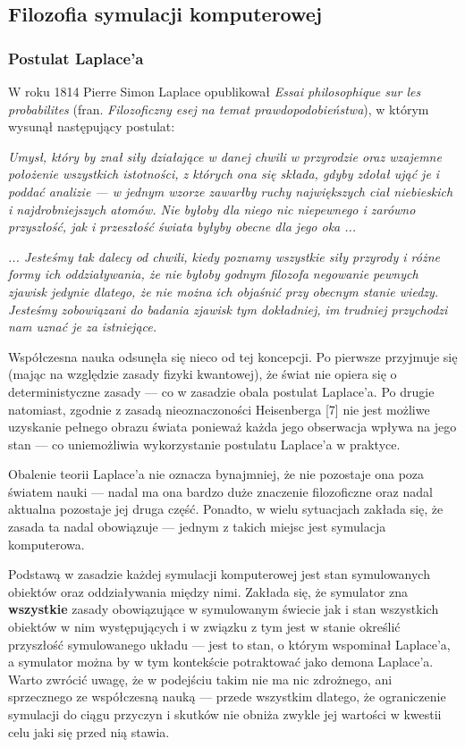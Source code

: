 \subsection{Filozofia symulacji komputerowej}

\subsubsection{Postulat Laplace'a}
\par{
W roku 1814 Pierre Simon Laplace opublikował \textit{Essai philosophique sur les probabilites} (fran. \textit{Filozoficzny esej na temat prawdopodobieństwa}), w którym wysunął następujący postulat:
}
\par{
\textit{Umysł, który by znał siły działające w danej chwili w przyrodzie oraz wzajemne położenie wszystkich istotności, z których ona się składa, gdyby zdołał ująć je i poddać analizie --- w jednym wzorze zawarłby ruchy największych ciał niebieskich i najdrobniejszych atomów. Nie byłoby dla niego nic niepewnego i zarówno przyszłość, jak i przeszłość świata byłyby obecne dla jego oka ...
}}
\par{
\textit{... Jesteśmy tak dalecy od chwili, kiedy poznamy wszystkie siły przyrody i różne formy ich oddziaływania, że nie byłoby godnym filozofa negowanie pewnych zjawisk jedynie dlatego, że nie można ich objaśnić przy obecnym stanie wiedzy. Jesteśmy zobowiązani do badania zjawisk tym dokładniej, im trudniej przychodzi nam uznać je za istniejące.}
}

\par{
Współczesna nauka odsunęła się nieco od tej koncepcji. Po pierwsze przyjmuje się (mając na względzie zasady fizyki kwantowej), że świat nie opiera się o deterministyczne zasady --- co w zasadzie obala postulat Laplace'a. Po drugie natomiast, zgodnie z zasadą nieoznaczoności Heisenberga [7] nie jest możliwe uzyskanie pełnego obrazu świata ponieważ każda jego obserwacja wpływa na jego stan --- co uniemożliwia wykorzystanie postulatu Laplace'a w praktyce.
}
\par{
Obalenie teorii Laplace'a nie oznacza bynajmniej, że nie pozostaje ona poza światem nauki --- nadal ma ona bardzo duże znaczenie filozoficzne oraz nadal aktualna pozostaje jej druga część. Ponadto, w wielu sytuacjach zakłada się, że zasada ta nadal obowiązuje --- jednym z takich miejsc jest symulacja komputerowa.
}
\par{
Podstawą w zasadzie każdej symulacji komputerowej jest stan symulowanych obiektów oraz oddziaływania między nimi. Zakłada się, że symulator zna \textbf{wszystkie} zasady obowiązujące w symulowanym świecie jak i stan wszystkich obiektów w nim występujących i w związku z tym jest w stanie określić przyszłość symulowanego układu --- jest to stan, o którym wspominał Laplace'a, a symulator można by w tym kontekście potraktować jako demona Laplace'a. Warto zwrócić uwagę, że w podejściu takim nie ma nic zdrożnego, ani sprzecznego ze współczesną nauką --- przede wszystkim dlatego, że ograniczenie symulacji do ciągu przyczyn i skutków nie obniża zwykle jej wartości w kwestii celu jaki się przed nią stawia.
}

